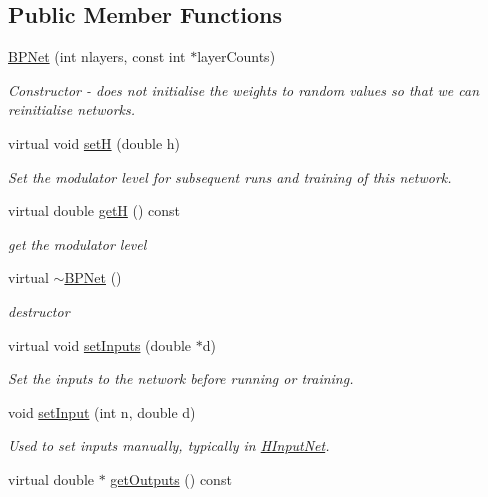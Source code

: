\subsection*{Public Member Functions}
\begin{DoxyCompactItemize}
\item 
\hyperlink{classBPNet_acc0ad3e9fb7c706a4bc8676b3aaf47b8}{B\+P\+Net} (int nlayers, const int $\ast$layer\+Counts)
\begin{DoxyCompactList}\small\item\em Constructor -\/ does not initialise the weights to random values so that we can reinitialise networks. \end{DoxyCompactList}\item 
virtual void \hyperlink{classBPNet_a98fa374aec169a3e741f2ce96fac7094}{setH} (double h)
\begin{DoxyCompactList}\small\item\em Set the modulator level for subsequent runs and training of this network. \end{DoxyCompactList}\item 
virtual double \hyperlink{classBPNet_aef1082e622022f25bee51013fab29aa0}{getH} () const 
\begin{DoxyCompactList}\small\item\em get the modulator level \end{DoxyCompactList}\item 
virtual \hyperlink{classBPNet_a7a452b3f05cc7e72b897a3546a38c010}{$\sim$\+B\+P\+Net} ()
\begin{DoxyCompactList}\small\item\em destructor \end{DoxyCompactList}\item 
virtual void \hyperlink{classBPNet_ad95c2a033ee8246637a6ce55e685429a}{set\+Inputs} (double $\ast$d)
\begin{DoxyCompactList}\small\item\em Set the inputs to the network before running or training. \end{DoxyCompactList}\item 
void \hyperlink{classBPNet_ae9e80dbedb62e973efdef21745a4a27a}{set\+Input} (int n, double d)
\begin{DoxyCompactList}\small\item\em Used to set inputs manually, typically in \hyperlink{classHInputNet}{H\+Input\+Net}. \end{DoxyCompactList}\item 
virtual double $\ast$ \hyperlink{classBPNet_adf9256df2239cdef0cb7ad3b45d0e06e}{get\+Outputs} () const 

\end{DoxyCompactItemize}
